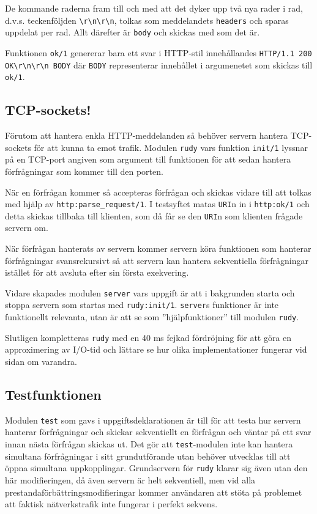 \documentclass[a4paper, 11pt]{article}
\begin{document}
De kommande raderna fram till och med att det dyker upp två nya rader i rad, d.v.s. teckenföljden \lstinline$\r\n\r\n$, tolkas som meddelandets \texttt{headers} och sparas uppdelat per rad. Allt därefter är \texttt{body} och skickas med  som det är.

Funktionen \texttt{ok/1} genererar bara ett svar i HTTP-stil innehållandes \lstinline$HTTP/1.1 200 OK\r\n\r\n BODY$ där \texttt{BODY} representerar innehållet i argumenetet som skickas till \texttt{ok/1}.

\subsection{TCP-sockets!}
\label{subsec:tcp}
Förutom att hantera enkla HTTP-meddelanden så behöver servern hantera TCP-sockets för att kunna ta emot trafik. Modulen \texttt{rudy} vars funktion \texttt{init/1} lyssnar på en TCP-port angiven som argument till funktionen för att sedan hantera förfrågningar som kommer till den porten.

När en förfrågan kommer så accepteras förfrågan och skickas vidare till att tolkas med hjälp av \texttt{http:parse_request/1}. I testsyftet matas \texttt{URI}n in i \texttt{http:ok/1} och detta skickas tillbaka till klienten, som då får se den \texttt{URI}n som klienten frågade servern om.

När förfrågan hanterats av servern kommer servern köra funktionen som hanterar förfrågningar svansrekursivt så att servern kan hantera sekventiella förfrågningar istället för att avsluta efter sin första exekvering.

Vidare skapades modulen \texttt{server} vars uppgift är att i bakgrunden starta och stoppa servern som startas med \texttt{rudy:init/1}. \texttt{server}s funktioner är inte funktionellt relevanta, utan är att se som ''hjälpfunktioner'' till modulen \texttt{rudy}.

Slutligen kompletteras \texttt{rudy} med en 40 ms fejkad fördröjning för att göra en approximering av I/O-tid och lättare se hur olika implementationer fungerar vid sidan om varandra.

\subsection{Testfunktionen}
Modulen \texttt{test} som gavs i uppgiftsdeklarationen är till för att testa hur servern hanterar förfrågningar och skickar sekventiellt en förfrågan och väntar på ett svar innan nästa förfrågan skickas ut. Det gör att \texttt{test}-modulen inte kan hantera simultana förfrågningar i sitt grundutförande utan behöver utvecklas till att öppna simultana uppkopplingar. Grundservern för \texttt{rudy} klarar sig även utan den här modifieringen, då även servern är helt sekventiell, men vid alla prestandaförbättringsmodifieringar kommer användaren att stöta på problemet att faktisk nätverkstrafik inte fungerar i perfekt sekvens.
\end{document}
